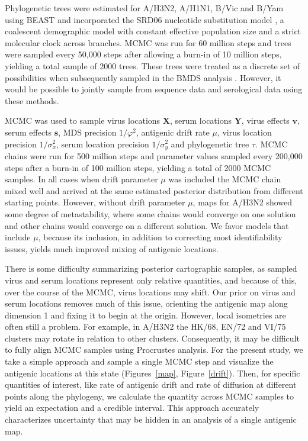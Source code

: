 \documentclass[11pt,oneside,letterpaper]{article}
\newcommand{\viruses}{\mathbf{X}}					%
\newcommand{\sera}{\mathbf{Y}}						%
\newcommand{\ves}{\mathbf{v}}						%
\newcommand{\ses}{\mathbf{s}}						%
\newcommand{\mdssd}{\varphi}						%
\newcommand{\virussd}{\sigma_x}						%
\newcommand{\serumsd}{\sigma_y}						%
\newcommand{\drift}{\mu}							%
\newcommand{\tree}{\tau}							%
\begin{document}
Phylogenetic trees were estimated for A/H3N2, A/H1N1, B/Vic and B/Yam using BEAST \cite{BEAST17} and incorporated the SRD06 nucleotide substitution model \cite{Shapiro06}, a coalescent demographic model with constant effective population size and a strict molecular clock across branches.
MCMC was run for 60 million steps and trees were sampled every 50,000 steps after allowing a burn-in of 10 million steps, yielding a total sample of 2000 trees.
These trees were treated as a discrete set of possibilities when subsequently sampled in the BMDS analysis \cite{Pagel04}.
However, it would be possible to jointly sample from sequence data and serological data using these methods.

MCMC was used to sample virus locations $\viruses$, serum locations $\sera$, virus effects $\ves$, serum effects $\ses$, MDS precision $1/\mdssd^2$, antigenic drift rate $\drift$, virus location precision $1/\virussd^2$, serum location precision $1/\serumsd^2$ and phylogenetic tree $\tree$.
MCMC chains were run for 500 million steps and parameter values sampled every 200,000 steps after a burn-in of 100 million steps, yielding a total of 2000 MCMC samples.
In all cases when drift parameter $\drift$ was included the MCMC chain mixed well and arrived at the same estimated posterior distribution from different starting points.
However, without drift parameter $\drift$, maps for A/H3N2 showed some degree of metastability, where some chains would converge on one solution and other chains would converge on a different solution.
We favor models that include $\drift$, because its inclusion, in addition to correcting most identifiability issues, yields much improved mixing of antigenic locations. 

There is some difficulty summarizing posterior cartographic samples, as sampled virus and serum locations represent only relative quantities, and because of this, over the course of the MCMC, virus locations may shift.
Our prior on virus and serum locations removes much of this issue, orienting the antigenic map along dimension 1 and fixing it to begin at the origin.
However, local isometries are often still a problem.
For example, in A/H3N2 the HK/68, EN/72 and VI/75 clusters may rotate in relation to other clusters.
Consequently, it may be difficult to fully align MCMC samples using Procrustes analysis.
For the present study, we take a simple approach and sample a single MCMC step and visualize the antigenic locations at this state (Figures~\ref{map}, Figure~\ref{drift}).
Then, for specific quantities of interest, like rate of antigenic drift and rate of diffusion at different points along the phylogeny, we calculate the quantity across MCMC samples to yield an expectation and a credible interval.
This approach accurately characterizes uncertainty that may be hidden in an analysis of a single antigenic map.
\end{document}
